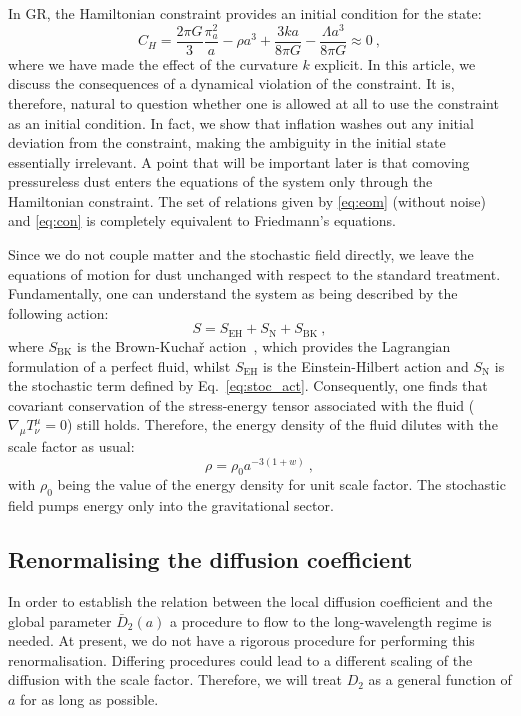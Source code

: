 \documentclass[amsmath,amssymb,11pt]{article}
\begin{document}
In GR, the Hamiltonian constraint provides an initial condition for the state:
\begin{equation}
\label{eq:con}
    C_H= \frac{2 \pi G}{3} \frac{\pi_a^2}{a}-\rho a^3 + \frac{3ka}{8\pi G}  - \frac{\Lambda a^3}{8\pi G}  \approx 0\ ,
\end{equation}
where we have made the effect of the curvature $k$ explicit.
In this article, we discuss the consequences of a dynamical violation of the constraint. It is, therefore, natural to question whether one is allowed at all to use the constraint as an initial condition. In fact, we show that inflation washes out any initial deviation from the constraint, making the ambiguity in the initial state essentially irrelevant.
A point that will be important later is that comoving pressureless dust enters the equations of the system only through the Hamiltonian constraint. The set of relations given by \eqref{eq:eom} (without noise) and \eqref{eq:con} is completely equivalent to Friedmann's equations.

Since we do not couple matter and the stochastic field directly, we leave the equations of motion for dust unchanged with respect to the standard treatment. Fundamentally, one can understand the system as being described by the following action:
\begin{equation}
    S=S_{\text{EH}}+S_{\text{N}}+S_\text{BK} \ ,
\end{equation}
where $S_\text{BK}$ is the Brown-Kucha\v{r} action~\cite{brown1995dust}, which provides the Lagrangian formulation of a perfect fluid, whilst $S_{\text{EH}}$ is the Einstein-Hilbert action and $S_{\text{N}}$ is the stochastic term defined by Eq.~\eqref{eq:stoc_act}. Consequently, one finds that covariant conservation of the stress-energy tensor associated with the fluid ($\nabla_\mu T^{\mu}_\nu = 0$) still holds. Therefore, the energy density of the fluid dilutes with the scale factor as usual:
\begin{equation}
    \rho = \rho_0 a^{-3(1+w)} \ ,
\end{equation}
with $\rho_0$ being the value of the energy density for unit scale factor. The stochastic field pumps energy only into the gravitational sector. 

\subsection{Renormalising the diffusion coefficient}
\label{sec:renormalisation}
In order to establish the relation between the local diffusion coefficient and the global parameter $\bar{D}_2 (a)$ a procedure to flow to the long-wavelength regime is needed. At present, we do not have a rigorous procedure for performing this renormalisation. Differing procedures could lead to a different scaling of the diffusion with the scale factor. Therefore, we will treat $D_2$ as a general function of $a$ for as long as possible.
\end{document}
